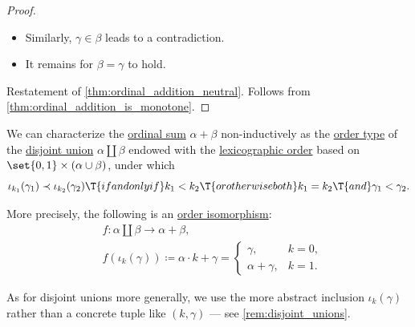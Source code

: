 \begin{proof}
\begin{itemize}
    \item Similarly, \( \gamma \in \beta \) leads to a contradiction.

    \item It remains for \( \beta = \gamma \) to hold.
  \end{itemize}

   Restatement of \cref{thm:ordinal_addition_neutral}.
   Follows from \cref{thm:ordinal_addition_is_monotone}.
\end{proof}

\begin{proposition}\label{thm:ordinal_addition_disjoin_union}
  We can characterize the \hyperref[def:ordinal_addition]{ordinal sum} \( \alpha + \beta \) non-inductively as the  \hyperref[def:well_ordered_order_type]{order type} of the \hyperref[def:disjoint_union]{disjoint union} \( \alpha \amalg \beta \) endowed with the \hyperref[def:lexicographic_order]{lexicographic order} based on \( \set{ 0, 1 } \times (\alpha \cup \beta) \), under which
  \begin{equation*}
    \iota_{k_1}(\gamma_1) \prec \iota_{k_2}(\gamma_2) \T{if and only if} k_1 < k_2 \T{or otherwise both} k_1 = k_2 \T{and} \gamma_1 < \gamma_2.
  \end{equation*}

  More precisely, the following is an \hyperref[def:partially_ordered_set/morphism]{order isomorphism}:
  \begin{equation*}
    \begin{aligned}
      &f: \alpha \amalg \beta \to \alpha + \beta, \\
      &f(\iota_k(\gamma)) \coloneqq \alpha \cdot k + \gamma = \begin{cases}
        \gamma,          &k = 0, \\
        \alpha + \gamma, &k = 1.
      \end{cases}
    \end{aligned}
  \end{equation*}
\end{proposition}
\begin{comments}
  \item As for disjoint unions more generally, we use the more abstract inclusion \( \iota_k(\gamma) \) rather than a concrete tuple like \( (k, \gamma) \) --- see \cref{rem:disjoint_unions}.
\end{comments}
